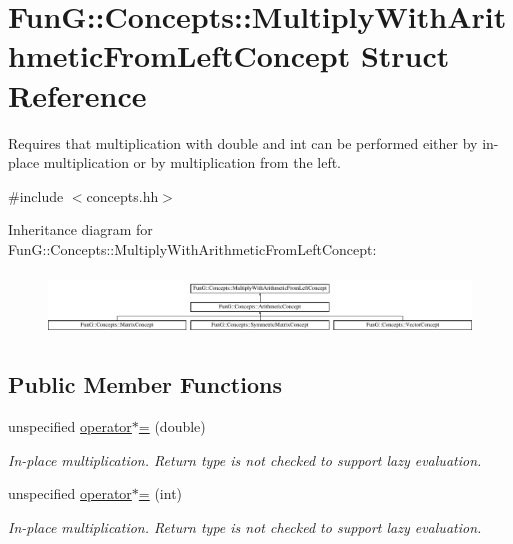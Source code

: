 \hypertarget{structFunG_1_1Concepts_1_1MultiplyWithArithmeticFromLeftConcept}{\section{Fun\-G\-:\-:Concepts\-:\-:Multiply\-With\-Arithmetic\-From\-Left\-Concept Struct Reference}
\label{structFunG_1_1Concepts_1_1MultiplyWithArithmeticFromLeftConcept}
}


Requires that multiplication with double and int can be performed either by in-\/place multiplication or by multiplication from the left.  




{\ttfamily \#include $<$concepts.\-hh$>$}

Inheritance diagram for Fun\-G\-:\-:Concepts\-:\-:Multiply\-With\-Arithmetic\-From\-Left\-Concept\-:\begin{figure}[H]
\begin{center}
\leavevmode
\includegraphics[height=1.661721cm]{structFunG_1_1Concepts_1_1MultiplyWithArithmeticFromLeftConcept}
\end{center}
\end{figure}
\subsection*{Public Member Functions}
\begin{DoxyCompactItemize}
\item 
\hypertarget{structFunG_1_1Concepts_1_1MultiplyWithArithmeticFromLeftConcept_aed5d281f1a44a60696bc512766a42b56}{unspecified \hyperlink{structFunG_1_1Concepts_1_1MultiplyWithArithmeticFromLeftConcept_aed5d281f1a44a60696bc512766a42b56}{operator$\ast$=} (double)}\label{structFunG_1_1Concepts_1_1MultiplyWithArithmeticFromLeftConcept_aed5d281f1a44a60696bc512766a42b56}

\begin{DoxyCompactList}\small\item\em In-\/place multiplication. Return type is not checked to support lazy evaluation. \end{DoxyCompactList}\item 
\hypertarget{structFunG_1_1Concepts_1_1MultiplyWithArithmeticFromLeftConcept_a3a7792406c3e6eb824b8f170b825a1d8}{unspecified \hyperlink{structFunG_1_1Concepts_1_1MultiplyWithArithmeticFromLeftConcept_a3a7792406c3e6eb824b8f170b825a1d8}{operator$\ast$=} (int)}\label{structFunG_1_1Concepts_1_1MultiplyWithArithmeticFromLeftConcept_a3a7792406c3e6eb824b8f170b825a1d8}

\begin{DoxyCompactList}\small\item\em In-\/place multiplication. Return type is not checked to support lazy evaluation. \end{DoxyCompactList}\end{DoxyCompactItemize}


